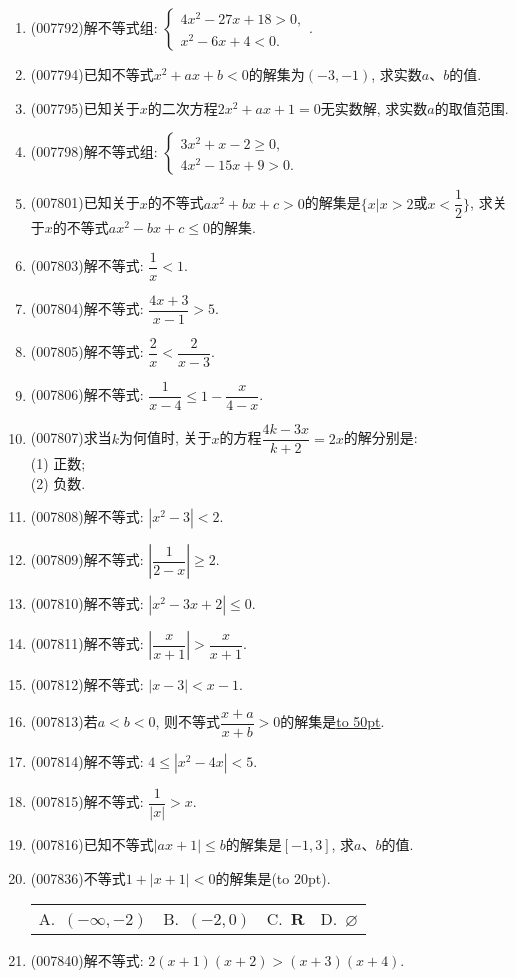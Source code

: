 \documentclass[10pt,a4paper]{article}
\newcommand{\blank}[1]{\underline{\hbox to #1pt{}}}
\newcommand{\bracket}[1]{(\hbox to #1pt{})}
\newcommand{\fourch}[4]{\par\begin{tabular}{p{.23\textwidth}p{.23\textwidth}p{.23\textwidth}p{.23\textwidth}}
A.~#1 &B.~#2& C.~#3& D.~#4
\end{tabular}}
\begin{document}
\begin{enumerate}[1.]
\item {\tiny (007792)}解不等式组: $\begin{cases} 4x^2-27x+18>0, \\ x^2-6x+4<0. \end{cases}$.
\item {\tiny (007794)}已知不等式$x^2+ax+b<0$的解集为$(-3,-1)$, 求实数$a$、$b$的值.
\item {\tiny (007795)}已知关于$x$的二次方程$2x^2+ax+1=0$无实数解, 求实数$a$的取值范围.
\item {\tiny (007798)}解不等式组: $\begin{cases} 3x^2+x-2\ge 0, \\ 4x^2-15x+9>0. \end{cases}$
\item {\tiny (007801)}已知关于$x$的不等式$ax^2+bx+c>0$的解集是$\{x|x>2$或$x<\dfrac 12\}$, 求关于$x$的不等式$ax^2-bx+c\le 0$的解集.
\item {\tiny (007803)}解不等式: $\dfrac 1x<1$.
\item {\tiny (007804)}解不等式: $\dfrac{4x+3}{x-1}>5$.
\item {\tiny (007805)}解不等式: $\dfrac 2x<\dfrac 2{x-3}$.
\item {\tiny (007806)}解不等式: $\dfrac 1{x-4}\le 1-\dfrac x{4-x}$.
\item {\tiny (007807)}求当$k$为何值时, 关于$x$的方程$\dfrac{4k-3x}{k+2}=2x$的解分别是:\\
(1) 正数;\\
(2) 负数.
\item {\tiny (007808)}解不等式: $|x^2-3|<2$.
\item {\tiny (007809)}解不等式: $|\dfrac 1{2-x}|\ge 2$.
\item {\tiny (007810)}解不等式: $|x^2-3x+2|\le 0$.
\item {\tiny (007811)}解不等式: $|\dfrac x{x+1}|>\dfrac x{x+1}$.
\item {\tiny (007812)}解不等式: $|x-3|<x-1$.
\item {\tiny (007813)}若$a<b<0$, 则不等式$\dfrac{x+a}{x+b}>0$的解集是\blank{50}.
\item {\tiny (007814)}解不等式: $4\le|x^2-4x|<5$.
\item {\tiny (007815)}解不等式: $\dfrac 1{|x|}>x$.
\item {\tiny (007816)}已知不等式$|ax+1|\le b$的解集是$[-1,3]$, 求$a$、$b$的值.
\item {\tiny (007836)}不等式$1+|x+1|<0$的解集是\bracket{20}.
\fourch{$(-\infty ,-2)$}{$(-2,0)$}{$\mathbf{R}$}{$\varnothing$}
\item {\tiny (007840)}解不等式: $2(x+1)(x+2)>(x+3)(x+4)$.

\end{enumerate}
\end{document}
